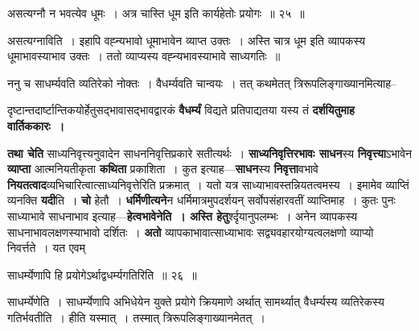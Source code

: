 \documentclass[article,12pt,a4paper]{memoir}
\begin{document}
	  \bigskip
	  \begingroup
	

	  \pstart असत्यग्नौ न भवत्येव धूमः । अत्र चास्ति धूम इति कार्यहेतोः प्रयोगः ॥ २५ ॥
	\pend
      
	  \endgroup
	 

	  \pstart असत्यग्नाविति । इहापि वह्न्यभावो धूमाभावेन व्याप्त उक्तः । अस्ति चात्र धूम इति व्यापकस्य धूमाभावस्याभाव उक्तः । ततो व्याप्यस्य वह्न्यभावस्याभावे साध्यगतिः ॥
	\pend
        

	  \pstart ननु च साधर्म्यवति व्यतिरेको नोक्तः । वैधर्म्यवति चान्वयः । तत् कथमेतत् त्रिरूपलिङ्गाख्यानमित्याह--
	\pend
      
	  \endgroup
	

	  \pstart दृष्टान्तदार्ष्टान्तिकयोर्हेतुसद्भावासद्भावद्वारकं \textbf{वैधर्म्यं} विद्यते प्रतिपाद्यतया यस्य तं \textbf{दर्शयितुमाह वार्तिककारः ।}
	\pend
      

	  \pstart \textbf{तथा चेति} साध्यनिवृत्त्यनुवादेन साधननिवृत्तिप्रकारे सतीत्यर्थः । \textbf{साध्यनिवृत्तिरभावः साधन}स्य \textbf{निवृत्त्या}ऽभावेन \textbf{व्याप्ता} आत्मनियतीकृता \textbf{कथिता} प्रकाशिता । कुत इत्याह—\textbf{साधन}स्य \textbf{निवृत्ता}वभावे \textbf{नियतत्वाद}व्यभिचारित्वात्साध्यनिवृत्तेरिति प्रक्रमात् । यतो यत्र साध्याभावस्तन्नियतत्वमस्य । इमामेव व्याप्तिं व्यनक्ति \textbf{यदी}ति । \textbf{चो} हेतौ । \textbf{धर्मिणीत्यने}न धर्मिमात्रमुपदर्शयन् सर्वोपसंहारवतीं व्याप्तिमाह । कुतः पुनः साध्याभावे साधनाभाव इत्याह—\textbf{हेत्वभावेनेति । अस्ति हेतु}र्श्दृयानुपलम्भः । अनेन व्यापकस्य साधनाभावलक्षणस्याभावो दर्शितः । \textbf{अतो} व्यापकाभावात्साध्याभावः सद्व्यवहारयोग्यत्वलक्षणो व्याप्यो निवर्त्तते । यत एवम्
	\pend
	  \bigskip
	  \begingroup
	
	  \bigskip
	  \begingroup
	

	  \pstart साधर्म्येणापि हि प्रयोगेऽर्थाद्वधर्म्यगतिरिति ॥ २६ ॥
	\pend
      
	  \endgroup
	 

	  \pstart साधर्म्येणेति । साधर्म्येणापि अभिधेयेन युक्ते प्रयोगे क्रियमाणे अर्थात् सामर्थ्यात् वैधर्म्यस्य व्यतिरेकस्य गतिर्भवतीति । हीति यस्मात् । तस्मात् त्रिरूपलिङ्गाख्यानमेतत् ।
	\pend
        
\end{document}
